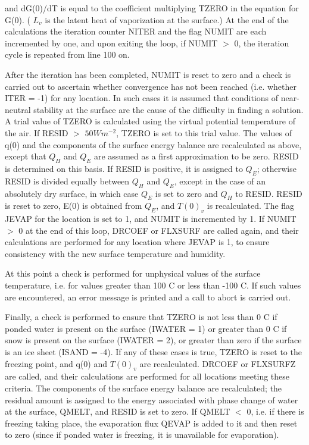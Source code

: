 and d\+G(0)/d\+T is equal to the coefficient multiplying T\+Z\+E\+R\+O in the equation for G(0). ( $L_v$ is the latent heat of vaporization at the surface.) At the end of the calculations the iteration counter N\+I\+T\+E\+R and the flag N\+U\+M\+I\+T are each incremented by one, and upon exiting the loop, if N\+U\+M\+I\+T $>$ 0, the iteration cycle is repeated from line 100 on.

After the iteration has been completed, N\+U\+M\+I\+T is reset to zero and a check is carried out to ascertain whether convergence has not been reached (i.\+e. whether I\+T\+E\+R = -\/1) for any location. In such cases it is assumed that conditions of near-\/neutral stability at the surface are the cause of the difficulty in finding a solution. A trial value of T\+Z\+E\+R\+O is calculated using the virtual potential temperature of the air. If R\+E\+S\+I\+D $>$ $50 W m^{-2}$, T\+Z\+E\+R\+O is set to this trial value. The values of q(0) and the components of the surface energy balance are recalculated as above, except that $Q_H$ and $Q_E$ are assumed as a first approximation to be zero. R\+E\+S\+I\+D is determined on this basis. If R\+E\+S\+I\+D is positive, it is assigned to $Q_E$; otherwise R\+E\+S\+I\+D is divided equally between $Q_H$ and $Q_E$, except in the case of an absolutely dry surface, in which case $Q_E$ is set to zero and $Q_H$ to R\+E\+S\+I\+D. R\+E\+S\+I\+D is reset to zero, E(0) is obtained from $Q_E$, and $T(0)_v$ is recalculated. The flag J\+E\+V\+A\+P for the location is set to 1, and N\+U\+M\+I\+T is incremented by 1. If N\+U\+M\+I\+T $>$ 0 at the end of this loop, D\+R\+C\+O\+E\+F or F\+L\+X\+S\+U\+R\+F are called again, and their calculations are performed for any location where J\+E\+V\+A\+P is 1, to ensure consistency with the new surface temperature and humidity.

At this point a check is performed for unphysical values of the surface temperature, i.\+e. for values greater than 100 C or less than -\/100 C. If such values are encountered, an error message is printed and a call to abort is carried out.

Finally, a check is performed to ensure that T\+Z\+E\+R\+O is not less than 0 C if ponded water is present on the surface (I\+W\+A\+T\+E\+R = 1) or greater than 0 C if snow is present on the surface (I\+W\+A\+T\+E\+R = 2), or greater than zero if the surface is an ice sheet (I\+S\+A\+N\+D = -\/4). If any of these cases is true, T\+Z\+E\+R\+O is reset to the freezing point, and q(0) and $T(0)_v$ are recalculated. D\+R\+C\+O\+E\+F or F\+L\+X\+S\+U\+R\+F\+Z are called, and their calculations are performed for all locations meeting these criteria. The components of the surface energy balance are recalculated; the residual amount is assigned to the energy associated with phase change of water at the surface, Q\+M\+E\+L\+T, and R\+E\+S\+I\+D is set to zero. If Q\+M\+E\+L\+T $<$ 0, i.\+e. if there is freezing taking place, the evaporation flux Q\+E\+V\+A\+P is added to it and then reset to zero (since if ponded water is freezing, it is unavailable for evaporation).

